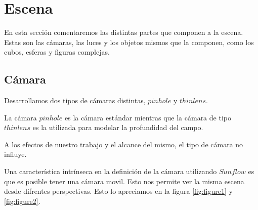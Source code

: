 \documentclass[a4paper,10pt]{article}
\begin{document}
\section{Escena}
\label{escena}
En esta secci\'on comentaremos las distintas partes que componen a la escena. 
Estas son las c\'amaras, las luces y los objetos mismos que la componen, como
los cubos, esferas y figuras complejas.

\subsection{C\'amara}

Desarrollamos dos tipos de c\'amaras distintas, $pinhole$ y $thinlens$.

La c\'amara $pinhole$ es la c\'amara est\'andar mientras que la c\'amara de
tipo $thinlens$ es la utilizada para modelar la profundidad del campo.

A los efectos de nuestro trabajo y el alcance del mismo, el tipo de c\'amara no
influye.

Una caracter\'istica intr\'inseca en la definici\'on de la c\'amara
utilizando $Sunflow$ es que es posible tener una c\'amara movil.  Esto nos
permite ver la misma escena desde difrentes perspectivas.  Esto lo apreciamos
en la figura \ref{fig:figure1} y \ref{fig:figure2}.
\end{document}
